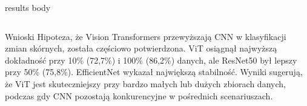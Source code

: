 \documentclass[final]{beamer}
\begin{document}
\begin{frame}[t]
\begin{columns}[T]
\begin{column}{.49\linewidth}
{\begin{beamercolorbox}[wd=\linewidth,dp=0.3cm]{results body}
\begin{columns}[T]
\begin{column}{.48\linewidth}
                    \end{column}
                \end{columns}
                
                \vspace{0.15cm}
            \end{beamercolorbox}}
            \vspace{0.2cm}
            
            \begin{block}{Wnioski}
                Hipoteza, że Vision Transformers przewyższają CNN w klasyfikacji zmian skórnych, została częściowo potwierdzona. ViT osiągnął najwyższą dokładność przy 10\% (72,7\%) i 100\% (86,2\%) danych, ale ResNet50 był lepszy przy 50\% (75,8\%). EfficientNet wykazał największą stabilność. Wyniki sugerują, że ViT jest skuteczniejszy przy bardzo małych lub dużych zbiorach danych, podczas gdy CNN pozostają konkurencyjne w pośrednich scenariuszach.
            \end{block}
        \end{column}
    \end{columns}
\end{frame}
\end{document}
